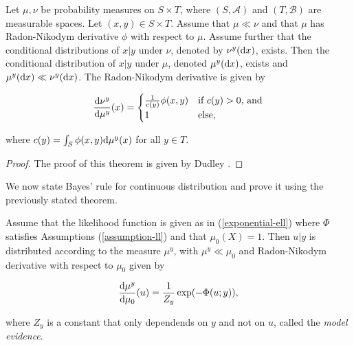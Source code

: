\begin{theorem}
  \label{duley}
  Let $\mu, \nu$ be probability measures on $S \times T$, where $(S, \mathcal{A})$ and $(T, \mathcal{B})$ are measurable spaces. Let $(x, y) \in S \times T$. Assume that $\mu \ll \nu$ and that $\mu$ has Radon-Nikodym derivative $\phi$ with respect to $\mu$. Assume further that the conditional distributions of $x|y$ under $\nu$, denoted by $\nu^y(\text{d} x)$, exists. Then the conditional distribution of $x|y$ under $\mu$, denoted $\mu^y(\text{d} x)$, exists and $\mu^y(\text{d} x) \ll \nu^y(\text{d} x)$. The Radon-Nikodym derivative is given by

  \begin{equation}
    \frac{\text{d} \nu^y}{\text{d} \mu^y}(x) =  \begin{cases}
      \frac1{c(y)}\phi(x,y) & \text{if $c(y) > 0$, and}\\
      1 & \text{else,}
    \end{cases}  
  \end{equation}

  where $c(y) = \int_{S}\phi(x,y)\text{d} \mu^y(x)$ for all $y \in T$.
\end{theorem}

\begin{proof}
  The proof of this theorem is given by Dudley \cite{dudley_2002}.
\end{proof}

We now state Bayes' rule for continuous distribution and prove it using the previously stated theorem.

\begin{theorem}
  Assume that the likelihood function is given as in (\ref{exponential-ell}) where $\Phi$ satisfies Assumptions (\ref{assumption-ll}) and that $\mu_0(X) = 1$. Then $u | y$ is distributed according to the measure $\mu^y$, with $\mu^y \ll \mu_0$ and Radon-Nikodym derivative with respect to $\mu_0$ given by

  \begin{equation}
    \frac{\text{d} \mu^y}{\text{d} \mu_0}(u) = \frac1{Z_y}\exp(-\Phi(u;y)),
  \end{equation}

  where $Z_y$ is a constant that only dependends on $y$ and not on $u$, called the \textit{model evidence}.
\end{theorem}

